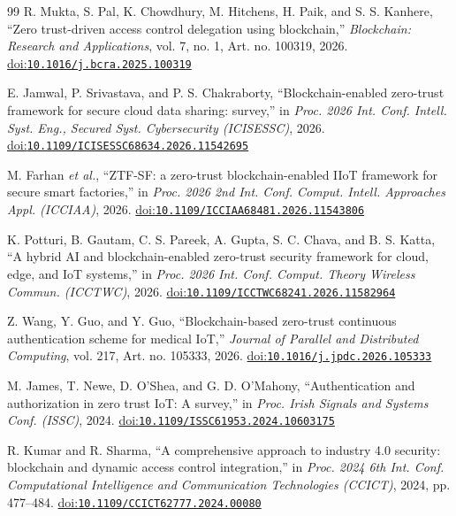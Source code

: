 \begin{thebibliography}{99}
R. Mukta, S. Pal, K. Chowdhury, M. Hitchens, H. Paik, and S. S. Kanhere, ``Zero trust-driven access control delegation using blockchain,'' \emph{Blockchain: Research and Applications}, vol. 7, no. 1, Art. no. 100319, 2026. \href{https://doi.org/10.1016/j.bcra.2025.100319}{doi:\nolinkurl{10.1016/j.bcra.2025.100319}}

E. Jamwal, P. Srivastava, and P. S. Chakraborty, ``Blockchain-enabled zero-trust framework for secure cloud data sharing: survey,'' in \emph{Proc. 2026 Int. Conf. Intell. Syst. Eng., Secured Syst. Cybersecurity (ICISESSC)}, 2026. \href{https://doi.org/10.1109/ICISESSC68634.2026.11542695}{doi:\nolinkurl{10.1109/ICISESSC68634.2026.11542695}}

M. Farhan \emph{et al.}, ``ZTF-SF: a zero-trust blockchain-enabled IIoT framework for secure smart factories,'' in \emph{Proc. 2026 2nd Int. Conf. Comput. Intell. Approaches Appl. (ICCIAA)}, 2026. \href{https://doi.org/10.1109/ICCIAA68481.2026.11543806}{doi:\nolinkurl{10.1109/ICCIAA68481.2026.11543806}}

K. Potturi, B. Gautam, C. S. Pareek, A. Gupta, S. C. Chava, and B. S. Katta, ``A hybrid AI and blockchain-enabled zero-trust security framework for cloud, edge, and IoT systems,'' in \emph{Proc. 2026 Int. Conf. Comput. Theory Wireless Commun. (ICCTWC)}, 2026. \href{https://doi.org/10.1109/ICCTWC68241.2026.11582964}{doi:\nolinkurl{10.1109/ICCTWC68241.2026.11582964}}

Z. Wang, Y. Guo, and Y. Guo, ``Blockchain-based zero-trust continuous authentication scheme for medical IoT,'' \emph{Journal of Parallel and Distributed Computing}, vol. 217, Art. no. 105333, 2026. \href{https://doi.org/10.1016/j.jpdc.2026.105333}{doi:\nolinkurl{10.1016/j.jpdc.2026.105333}}

M. James, T. Newe, D. O'Shea, and G. D. O'Mahony, ``Authentication and authorization in zero trust IoT: A survey,'' in \emph{Proc. Irish Signals and Systems Conf. (ISSC)}, 2024. \href{https://doi.org/10.1109/ISSC61953.2024.10603175}{doi:\nolinkurl{10.1109/ISSC61953.2024.10603175}}

R. Kumar and R. Sharma, ``A comprehensive approach to industry 4.0 security: blockchain and dynamic access control integration,'' in \emph{Proc. 2024 6th Int. Conf. Computational Intelligence and Communication Technologies (CCICT)}, 2024, pp. 477--484. \href{https://doi.org/10.1109/CCICT62777.2024.00080}{doi:\nolinkurl{10.1109/CCICT62777.2024.00080}}


\end{thebibliography}
